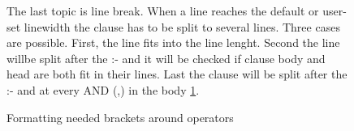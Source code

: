 \documentclass{article}
\begin{document}
\begin{figure}[h] The last topic is line break. When a line reaches the default or user-set linewidth the clause has to be split to several lines. Three cases are possible. First, the line fits into the line lenght. Second the line willbe split after the :- and it will be checked if clause body and head are both fit in their lines. Last the clause will be split after the :- and at every AND (,) in the body \ref{lst:line_break}.\\

\begin{minipage}{1\textwidth}

\end{minipage}

\begin{minipage}{1\textwidth}

\end{minipage}

\caption{Formatting needed brackets around operators}
\label{lst:line_break}
\end{figure}
% 
% 
\end{document}
